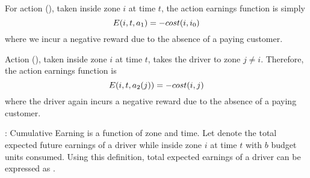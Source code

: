 	\item For action {\gohomeaction} ({\gohome}), taken inside zone $i$ at time $t$, the action earnings function is simply
	\begin{equation}\label{eq:a1}
	E({i},{t},{a_1}) = - cost(i,{i_0})
	\end{equation}
	where we incur a negative reward due to the absence of a paying customer. 

	\item Action {\relocateaction} ({\relocate}), taken inside zone $i$ at time $t$, 
	takes the driver to zone $j \neq i$. Therefore, the action earnings function is 
	\begin{equation}\label{eq:a2}
	E({i},{t},{a_2(j)}) = - cost(i,j)
	\end{equation}
	where the driver again incurs a negative reward due to the absence of a paying customer. 
\squishend

\iffalse
{}:
Cumulative Earning is a function of zone and time. Let {} denote the total expected future earnings of a driver
while inside zone $i$ at time $t$ with $b$ budget units consumed. Using this definition, total expected earnings of a driver can be expressed
as {}.

